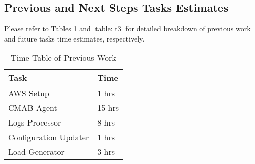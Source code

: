 \documentclass[conference]{IEEEtran}
\begin{document}
\subsection{Previous and Next Steps Tasks Estimates}

Please refer to Tables \ref{table: t2} and \ref{table: t3} for detailed breakdown of previous work and future tasks time estimates, respectively.

\begin{table}[h]
    \centering
    \begin{tabular}{| l | l |}
        \hline Task & Time \\
        \hline AWS Setup & 1 hrs \\
        \hline CMAB Agent & 15 hrs \\
        \hline Logs Processor & 8 hrs\\
        \hline Configuration Updater & 1 hrs \\
        \hline Load Generator & 3 hrs \\
        \hline
    \end{tabular}
    \caption{Time Table of Previous Work}
    \label{table: t2}
\end{table}




\end{document}
